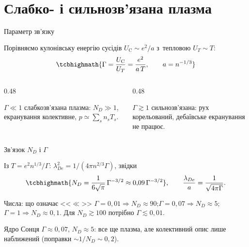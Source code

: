 \documentclass[]{beamer}
\begin{document}
\section{Слабко- і сильнозв'язана плазма}

\begin{frame}{Параметр зв'язку}
	\begin{block}{}\justifying\small
		Порівняємо кулонівську енергію сусідів $U_{\mathrm C}\sim e^2/a$ з~тепловою $U_T\sim T$:
		\begin{equation*}
			\tcbhighmath{\Gamma=\frac{U_{\mathrm C}}{U_T}=\frac{e^2}{a\,T},\qquad a=n^{-1/3}}
		\end{equation*}
	\end{block}
	\begin{columns}[T]
		\begin{column}{0.48\linewidth}
			\begin{block}{$\Gamma\ll1$}\justifying\small
				\alert{слабкозв'язана} плазма: $N_D\gg1$, екранування колективне, $p\simeq\sum_sn_sT_s$.
			\end{block}
		\end{column}
		\begin{column}{0.48\linewidth}
			\begin{block}{$\Gamma\gtrsim1$}\justifying\small
				\alert{сильнозв'язана}: рух корельований, дебаївське екранування не працює.
			\end{block}
		\end{column}
	\end{columns}
\end{frame}

\begin{frame}{Зв'язок $N_D$ і $\Gamma$}
	\begin{block}{}\small
		Із $T=e^2n^{1/3}/\Gamma$: $\lambda_{De}^2=1/(4\pi n^{2/3}\Gamma)$, звідки
		\begin{equation*}
			\tcbhighmath{N_D=\frac{1}{6\sqrt\pi}\,\Gamma^{-3/2}\approx0{,}09\,\Gamma^{-3/2}},\qquad
			\frac{\lambda_{De}}{a}=\frac{1}{\sqrt{4\pi\Gamma}}.
		\end{equation*}
	\end{block}
	\begin{block}{Числа: що означає <<$\ll$>>}\justifying\small
		$\Gamma=0{,}01\Rightarrow N_D\approx90$;\quad $\Gamma=0{,}07\Rightarrow N_D\approx5$;\quad $\Gamma=1\Rightarrow N_D\approx0{,}1$.
		Для $N_D\gtrsim100$ потрібно $\Gamma\lesssim0{,}01$.
	\end{block}
	\begin{exampleblock}{Ядро Сонця}\justifying\small
		$\Gamma\approx0{,}07$, $N_D\approx5$: все ще плазма, але колективний опис лише наближений (поправки $\sim1/N_D\sim0{,}2$).
	\end{exampleblock}
\end{frame}
\end{document}
